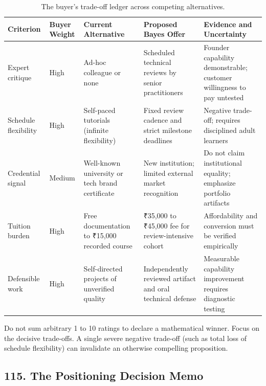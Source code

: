 \begin{table}[t]
\centering
\small
\begin{tabularx}{\textwidth}{>{\raggedright\arraybackslash}p{3cm} >{\raggedright\arraybackslash}p{2.5cm} >{\raggedright\arraybackslash}X >{\raggedright\arraybackslash}X >{\raggedright\arraybackslash}X}
\toprule
\textbf{Criterion} & \textbf{Buyer Weight} & \textbf{Current Alternative} & \textbf{Proposed Bayes Offer} & \textbf{Evidence and Uncertainty} \\
\midrule
Expert critique & High & Ad-hoc colleague or none & Scheduled technical reviews by senior practitioners & Founder capability demonstrable; customer willingness to pay untested \\
Schedule flexibility & High & Self-paced tutorials (infinite flexibility) & Fixed review cadence and strict milestone deadlines & Negative trade-off; requires disciplined adult learners \\
Credential signal & Medium & Well-known university or tech brand certificate & New institution; limited external market recognition & Do not claim institutional equality; emphasize portfolio artifacts \\
Tuition burden & High & Free documentation to ₹15,000 recorded course & ₹35,000 to ₹45,000 fee for review-intensive cohort & Affordability and conversion must be verified empirically \\
Defensible work & High & Self-directed projects of unverified quality & Independently reviewed artifact and oral technical defense & Measurable capability improvement requires diagnostic testing \\
\bottomrule
\end{tabularx}
\caption{The buyer's trade-off ledger across competing alternatives.}
\label{tab:ch8-tradeoff-ledger}
\end{table}

Do not sum arbitrary 1 to 10 ratings to declare a mathematical winner. Focus on the decisive trade-offs. A single severe negative trade-off (such as total loss of schedule flexibility) can invalidate an otherwise compelling proposition.

\subsection*{115. The Positioning Decision Memo}

